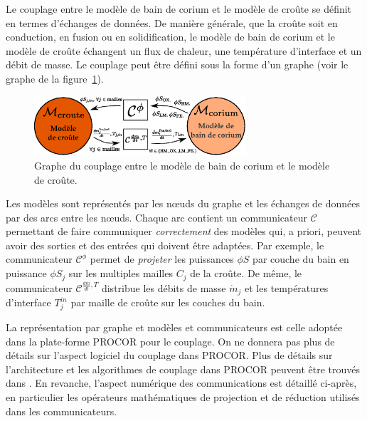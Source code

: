 Le couplage entre le modèle de bain de corium et le modèle de croûte se définit en termes d'échanges de données. De manière générale, que la croûte soit en conduction, en fusion ou en solidification, le modèle de bain de corium et le modèle de croûte échangent un flux de chaleur, une température d'interface et un débit de masse. Le couplage peut être défini sous la forme d'un graphe (voir le graphe de la figure~\ref{fig:graphe_couplage_corium_croute}). 
\begin{figure}
\centering
\includegraphics[width=0.7\textwidth, keepaspectratio=true]{Figures/graphe_couplage_corium_croute.eps}
\caption{Graphe du couplage entre le modèle de bain de corium et le modèle de croûte.}
\label{fig:graphe_couplage_corium_croute}
\end{figure}
Les modèles sont représentés par les n\oe{}uds du graphe et les échanges de données par des arcs entre les n\oe{}uds. Chaque arc contient un communicateur $\mathcal{C}$ permettant de faire communiquer \emph{correctement} des modèles qui, a priori, peuvent avoir des sorties et des entrées qui doivent être adaptées. Par exemple, le communicateur $\mathcal{C}^{\phi}$ permet de \emph{projeter} les puissances $\phi S$ par couche du bain en puissance $\phi S_j$ sur les multiples mailles $C_j$ de la croûte. De même, le communicateur $\mathcal{C}^{\frac{dm}{dt}, T}$ distribue les débits de masse $\dot{m}_j$ et les températures d'interface $T_j^{in}$ par maille de croûte sur les couches du bain. 

La représentation par graphe et modèles et communicateurs est celle adoptée dans la plate-forme PROCOR pour le couplage. On ne donnera pas plus de détails sur l'aspect logiciel du couplage dans PROCOR. Plus de détails sur l'architecture et les algorithmes de couplage dans PROCOR peuvent être trouvés dans \cite{Viot2018}. En revanche, l'aspect numérique des communications est détaillé ci-après, en particulier les opérateurs mathématiques de projection et de réduction utilisés dans les communicateurs.

